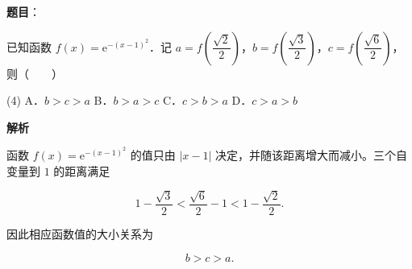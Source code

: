 \begin{answer}

\textbf{题目}：

已知函数 $f(x)=\mathrm e^{-(x-1)^2}$．记 $a=f\left(\dfrac{\sqrt2}{2}\right)$，$b=f\left(\dfrac{\sqrt3}{2}\right)$，$c=f\left(\dfrac{\sqrt6}{2}\right)$，则\mbox{（　　）}

\begin{gkopts}(4)
\task A．$b>c>a$
\task B．$b>a>c$
\task C．$c>b>a$
\task D．$c>a>b$
\end{gkopts}

\textbf{解析}

函数 $f(x)=\mathrm e^{-(x-1)^2}$ 的值只由 $|x-1|$ 决定，并随该距离增大而减小。三个自变量到 $1$ 的距离满足

\nopagebreak[4]
\[
1-\frac{\sqrt3}{2}
<\frac{\sqrt6}{2}-1
<1-\frac{\sqrt2}{2}.
\]

因此相应函数值的大小关系为

\nopagebreak[4]
\[
b>c>a.
\]


\end{answer}
